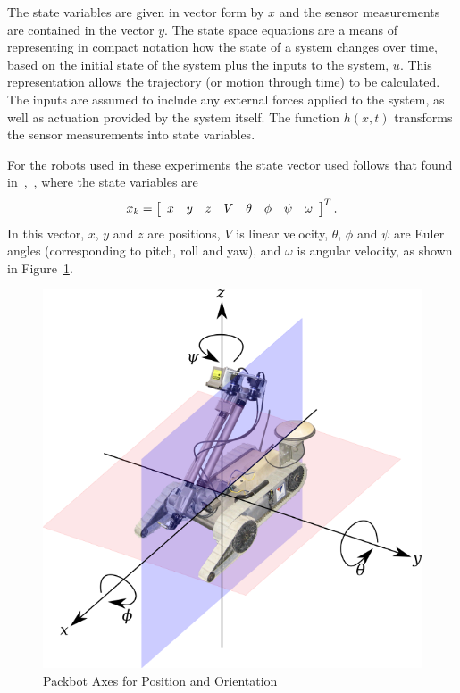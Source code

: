 The state variables are given in vector form by $x$ and the sensor measurements are contained in the vector $y$.
The state space equations are a means of representing in compact notation how the state of a system changes over time, based on the initial state of the system plus the inputs to the system, $u$.
This representation allows the trajectory (or motion through time) to be calculated.
The inputs are assumed to include any external forces applied to the system, as well as actuation provided by the system itself.
The function $h(x,t)$ transforms the sensor measurements into state variables.

For the robots used in these experiments the state vector used follows that found in~\cite{Kelly_1994_338},~\cite{Kelly_1994_333}, where the state variables are
\begin{align*}
x_k = \left[\begin{array}{c c c c c c c c} x & y & z & V & \theta & \phi & \psi & \omega \end{array}\right]^T.
\end{align*}
In this vector, $x$, $y$ and $z$ are positions, $V$ is linear velocity, $\theta$, $\phi$ and $\psi$ are Euler angles (corresponding to pitch, roll and yaw), and $\omega$ is angular velocity, as shown in Figure~\ref{fig:packbotaxes}.

\begin{figure}[ht!]
\centering
\includegraphics[width=.8\textwidth]{images/packbotaxes}
\caption{Packbot Axes for Position and Orientation}%
\label{fig:packbotaxes}
\end{figure}

